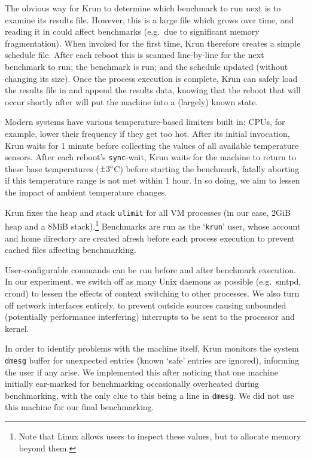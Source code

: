 \documentclass[acmlarge]{acmart}\settopmatter{printfolios=true}
\newcommand{\krun}{Krun\xspace}
\begin{document}
The obvious way for \krun to determine which benchmark to run next is to examine
its results file. However, this is a large file which grows over time, and
reading it in could affect benchmarks (e.g.~due to significant memory
fragmentation). When invoked for the first time, \krun
therefore creates a simple schedule file. After each reboot this is scanned
line-by-line for the next benchmark to run; the benchmark is run; and the schedule
updated (without changing its size). Once the process execution is
complete, \krun can safely load the results file in and append the results data,
knowing that the reboot that will occur shortly after will put the machine into
a (largely) known state.

Modern systems have various temperature-based limiters built in:
CPUs, for example, lower their frequency if they get too hot.
After its initial invocation, \krun waits for 1 minute before collecting
the values of all available temperature sensors. After each reboot's \texttt{sync}-wait, \krun waits
for the machine to return to these base temperatures ($\pm3\degree$C) before
starting the benchmark, fatally aborting if this temperature range is not
met within 1 hour. In so doing, we aim to lessen the impact of ambient temperature changes.

\krun fixes the heap and stack \texttt{ulimit} for all VM processes
(in our case, 2GiB heap and a 8MiB stack).\footnote{Note that Linux allows users
to inspect these values, but to allocate memory beyond them.} Benchmarks are run
as the `\texttt{krun}' user, whose account and home directory are created
afresh before each process execution to prevent cached files affecting benchmarking.

User-configurable commands can be run before and after benchmark execution. In
our experiment, we switch off as many Unix daemons as possible (e.g.~smtpd,
crond) to lessen the effects of context switching to other processes. We also
turn off network interfaces entirely, to prevent outside sources causing unbounded
(potentially performance interfering) interrupts to be sent to the processor and kernel.

In order to identify problems with the machine itself, \krun monitors the
system \texttt{dmesg} buffer for unexpected entries (known `safe' entries
are ignored), informing the user if any arise. We implemented this after
noticing that one machine initially ear-marked for benchmarking occasionally
overheated during benchmarking, with the only clue to this being a line in \texttt{dmesg}.
We did not use this machine for our final benchmarking.
\end{document}
